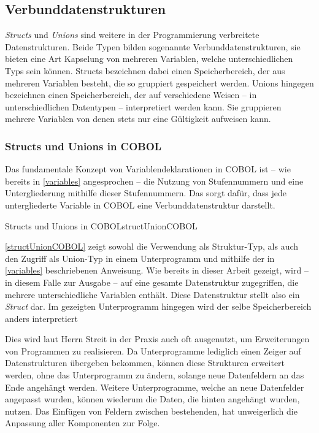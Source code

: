 \subsection{Verbunddatenstrukturen}\label{verbunddatenstrukturen}
\textit{Structs} und \textit{Unions} sind weitere in der Programmierung verbreitete Datenstrukturen. Beide Typen bilden sogenannte Verbunddatenstrukturen, \dahe sie bieten eine Art Kapselung von mehreren Variablen, welche unterschiedlichen Typs sein können. Structs bezeichnen dabei einen Speicherbereich, der aus mehreren Variablen besteht, die so gruppiert gespeichert werden. Unions hingegen bezeichnen einen Speicherbereich, der auf verschiedene Weisen -- in unterschiedlichen Datentypen -- interpretiert werden kann. Sie gruppieren mehrere Variablen von denen stets nur eine Gültigkeit aufweisen kann.

\subsubsection*{Structs und Unions in COBOL}

Das fundamentale Konzept von Variablendeklarationen in COBOL ist -- wie bereits in \autoref{variables} angesprochen -- die Nutzung von Stufennummern und eine Untergliederung mithilfe dieser Stufennummern. Das sorgt dafür, dass jede untergliederte Variable in COBOL eine Verbunddatenstruktur darstellt.

\begin{codeWithCaption}{Structs und Unions in COBOL}{structUnionCOBOL}
\end{codeWithCaption}

\autoref{structUnionCOBOL} zeigt sowohl die Verwendung als Struktur-Typ, als auch den Zugriff als Union-Typ in einem Unterprogramm und mithilfe der in \autoref{variables} beschriebenen  Anweisung. Wie bereits in dieser Arbeit gezeigt, wird -- in diesem Falle zur Ausgabe -- auf eine gesamte Datenstruktur zugegriffen, die mehrere unterschiedliche Variablen enthält. Diese Datenstruktur stellt also ein \textit{Struct} dar. Im gezeigten Unterprogramm hingegen wird der selbe Speicherbereich anders interpretiert

Dies wird laut Herrn Streit in der Praxis auch oft ausgenutzt, um Erweiterungen von Programmen zu realisieren. Da Unterprogramme lediglich einen Zeiger auf Datenstrukturen übergeben bekommen, können diese Strukturen erweitert werden, ohne das Unterprogramm zu ändern, solange neue Datenfeldern an das Ende angehängt werden. Weitere Unterprogramme, welche an neue Datenfelder angepasst wurden, können wiederum die Daten, die hinten angehängt wurden, nutzen. Das Einfügen von Feldern zwischen bestehenden, hat unweigerlich die Anpassung aller Komponenten zur Folge.

